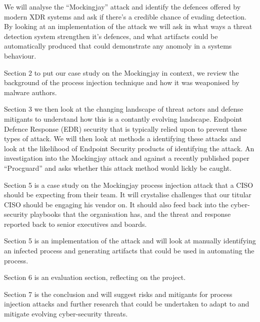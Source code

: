 We will analyse the ``Mockingjay'' attack and identify the defences offered by modern XDR systems and ask if there's a credible chance of evading detection.  By looking at an implementation of the attack we will ask in what ways a threat detection system strengthen it's defences, and what artifacts could be automatically produced that could demonstrate any anomoly in a systems behaviour. 

Section 2 to put our case study on the Mockingjay in context, we review the background of the process injection technique and how it was weaponised by malware authors.

Section 3 we then look at the changing landscape of threat actors and defense mitigants to understand how this is a contantly evolving landscape.  Endpoint Defence Response (EDR) security that is typically relied upon to prevent these types of attack.  We will then look at methods a identifying these attacks and look at the likelihood of Endpoint Security products of identifying the attack.   An investigation into the Mockingjay attack and against a recently published paper ``Procguard'' \autocite{Wang:2022} and asks whether this attack method would lickly be caught.

Section 5 is a case study on the Mockingjay process injection attack that a CISO should be expecting from their team.  It will crystalise challenges
that our titular CISO should be engaging his vendor on.  It should also feed back into the cyber-security playbooks that the organisation has, and
the threat and response reported back to senior executives and boards.


Section 5 is an implementation of the attack and will look at manually identifying an infected process and generating artifacts that could be used in automating the process.

Section 6 is an evaluation section, reflecting on the project.

Section 7 is the conclusion and will suggest risks and mitigants for process injection attacks and further research that could be undertaken to adapt to
and mitigate evolving cyber-security threats.